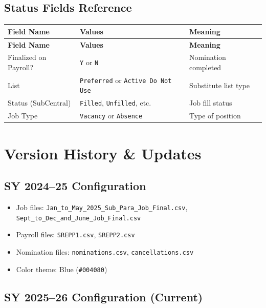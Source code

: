 \documentclass[12pt,letterpaper]{article}
\begin{document}
\subsection{Status Fields Reference}

\begin{longtable}{p{5cm}p{3cm}p{5cm}}
\toprule
\textbf{Field Name} & \textbf{Values} & \textbf{Meaning} \\
\midrule
\endfirsthead
\toprule
\textbf{Field Name} & \textbf{Values} & \textbf{Meaning} \\
\midrule
\endhead
Finalized on Payroll? & \texttt{Y} or \texttt{N} & Nomination completed \\
\midrule
List & \texttt{Preferred} or \texttt{Active Do Not Use} & Substitute list type \\
\midrule
Status (SubCentral) & \texttt{Filled}, \texttt{Unfilled}, etc. & Job fill status \\
\midrule
Job Type & \texttt{Vacancy} or \texttt{Absence} & Type of position \\
\bottomrule
\end{longtable}

\section{Version History \& Updates}

\subsection{SY 2024--25 Configuration}

\begin{itemize}[leftmargin=*]
    \item Job files: \texttt{Jan\_to\_May\_2025\_Sub\_Para\_Job\_Final.csv},\\
          \texttt{Sept\_to\_Dec\_and\_June\_Job\_Final.csv}
    \item Payroll files: \texttt{SREPP1.csv}, \texttt{SREPP2.csv}
    \item Nomination files: \texttt{nominations.csv}, \texttt{cancellations.csv}
    \item Color theme: Blue (\texttt{\#004080})
\end{itemize}

\subsection{SY 2025--26 Configuration (Current)}
\end{document}

